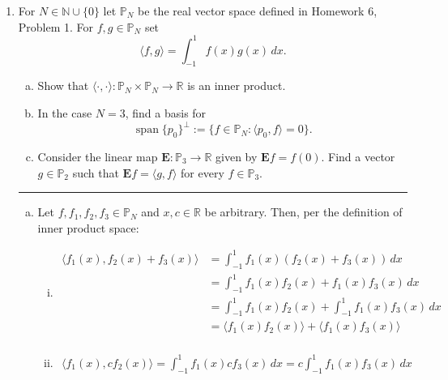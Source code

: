 \documentclass[12pt]{amsart}
\newcommand{\1}{\mathbbm{1}}
\numberwithin{equation}{section}
\numberwithin{Theorem}{section}
\theoremstyle{plain} %
\theoremstyle{definition}
\theoremstyle{remark}
\begin{document}
\thispagestyle{empty}

\bigskip


\begin{enumerate}[1.]

\item For \(N\in\mathbb{N}\cup\{0\}\) let \(\mathbb{P}_{N}\) be the real vector space defined in Homework 6, Problem 1. For \(f,g\in\mathbb{P}_{N}\) set
\[\langle f,g\rangle = \int_{-1}^{1}f(x)g(x)\,dx.\]

\begin{enumerate}[(a)]
\item Show that \(\langle\cdot,\cdot\rangle:\mathbb{P}_{N}\times\mathbb{P}_{N}\to\mathbb{R}\) is an inner product.\medskip

\item In the case \(N=3\), find a basis for 
\[\operatorname{span}\{p_{0}\}^{\bot}:=\{f\in\mathbb{P}_{N} : \langle p_{0},f\rangle = 0\}.\]

\item Consider the linear map \(\mathbf{E}:\mathbb{P}_{3}\to\mathbb{R}\) given by \(\mathbf{E}f = f(0)\). Find a vector \(g\in\mathbb{P}_{2}\) such that \(\mathbf{E}f = \langle g,f\rangle\) for every \(f\in\mathbb{P}_{3}\).

\end{enumerate}\bigskip

\hrule
\bigskip
\begin{enumerate}[(a)]
	\item
	Let \(f,f_1,f_2,f_3\in\mathbb{P}_N\) and \(x,c\in\mathbb{R}\) be arbitrary.
	Then, per the definition of inner product space:
	\begin{enumerate}[i.]
		\item 
		\begin{align*}
			\langle f_1(x), f_2(x)+f_3(x) \rangle
			&= \int_{-1}^{1}f_1(x) (f_2(x)+f_3(x))\,dx \\
			&= \int_{-1}^{1}f_1(x)f_2(x)+ f_1(x)f_3(x)\,dx \\
			&= \int_{-1}^{1}f_1(x)f_2(x)+ \int_{-1}^{1}f_1(x)f_3(x)\,dx \\
			&= \langle f_1(x)f_2(x)\rangle + \langle f_1(x)f_3(x)\rangle \\
		\end{align*}
		
		\item
		\begin{align*}
			\langle f_1(x),cf_2(x)\rangle
			= \int_{-1}^{1}f_1(x) cf_3(x)\,dx 
			= c\int_{-1}^{1}f_1(x)f_3(x)\,dx 
		\end{align*}
		

\end{enumerate}
\end{enumerate}
\end{enumerate}
\end{document}
